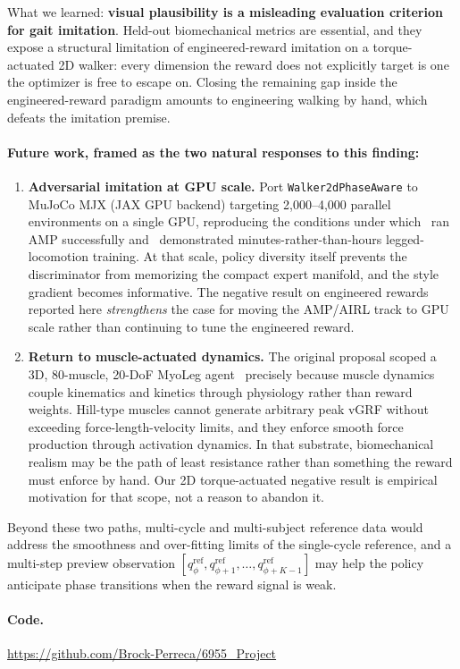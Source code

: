 \documentclass{article}
\begin{document}
What we learned: \textbf{visual plausibility is a misleading evaluation criterion for gait imitation}. Held-out biomechanical metrics are essential, and they expose a structural limitation of engineered-reward imitation on a torque-actuated 2D walker: every dimension the reward does not explicitly target is one the optimizer is free to escape on. Closing the remaining gap inside the engineered-reward paradigm amounts to engineering walking by hand, which defeats the imitation premise.

\paragraph{Future work, framed as the two natural responses to this finding:}
\begin{enumerate}\setlength\itemsep{1pt}
    \item \textbf{Adversarial imitation at GPU scale.} Port \texttt{Walker2dPhaseAware} to MuJoCo MJX (JAX GPU backend) targeting 2{,}000--4{,}000 parallel environments on a single GPU, reproducing the conditions under which~\cite{escontrela2022amp} ran AMP successfully and~\cite{rudin2022walk} demonstrated minutes-rather-than-hours legged-locomotion training. At that scale, policy diversity itself prevents the discriminator from memorizing the compact expert manifold, and the style gradient becomes informative. The negative result on engineered rewards reported here \emph{strengthens} the case for moving the AMP/AIRL track to GPU scale rather than continuing to tune the engineered reward.
    \item \textbf{Return to muscle-actuated dynamics.} The original proposal scoped a 3D, 80-muscle, 20-DoF MyoLeg agent~\cite{caggiano2022myosuite} precisely because muscle dynamics couple kinematics and kinetics through physiology rather than reward weights. Hill-type muscles cannot generate arbitrary peak vGRF without exceeding force-length-velocity limits, and they enforce smooth force production through activation dynamics. In that substrate, biomechanical realism may be the path of least resistance rather than something the reward must enforce by hand. Our 2D torque-actuated negative result is empirical motivation for that scope, not a reason to abandon it.
\end{enumerate}

Beyond these two paths, multi-cycle and multi-subject reference data would address the smoothness and over-fitting limits of the single-cycle reference, and a multi-step preview observation $[q^{\text{ref}}_\phi, q^{\text{ref}}_{\phi+1}, \ldots, q^{\text{ref}}_{\phi+K-1}]$ may help the policy anticipate phase transitions when the reward signal is weak.

\paragraph{Code.} \url{https://github.com/Brock-Perreca/6955_Project}



\end{document}
